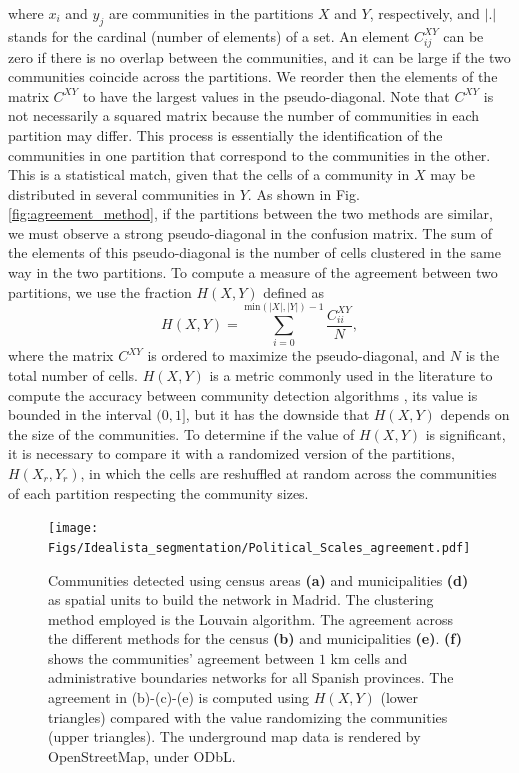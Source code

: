 where $x_i$ and $y_j$ are communities in the partitions $X$ and $Y$, respectively, and $| . |$ stands for the cardinal (number of elements) of a set. An element $C^{XY}_{ij}$ can be zero if there is no overlap between the communities, and it can be large if the two communities coincide across the partitions. We reorder then the elements of the matrix  $C^{XY}$ to have the largest values in the pseudo-diagonal. Note that $C^{XY}$ is not necessarily a squared matrix because the number of communities in each partition may differ. This process is essentially the identification of the communities in one partition that correspond to the communities in the other. This is a statistical match, given that the cells of a community in $X$ may be distributed in several communities in $Y$. As shown in Fig. \ref{fig:agreement_method}, if the partitions between the two methods are similar, we must observe a strong pseudo-diagonal in the confusion matrix. The sum of the elements of this pseudo-diagonal is the number of cells clustered in the same way in the two partitions. To compute a measure of the agreement between two partitions, we use the fraction $H(X,Y)$ \cite{girvan2002community,hric2014community} defined as 
\begin{equation}
H(X,Y) = \sum_{i = 0}^{\textrm{min}(|X|,|Y|)-1} \frac{C^{XY}_{ii}}{N} , 
\end{equation}
where the matrix $C^{XY}$ is ordered to maximize the pseudo-diagonal, and $N$ is the total number of cells. $H(X,Y)$ is a metric commonly used in the literature to compute the accuracy between community detection algorithms \cite{danon2005comparing,duch2005community,li2008quantitative,darst2014improving,chen2015deep,saoud2016community,wang2017mitigation,fortunato2016community}, its value is bounded in the interval $(0,1]$, but it has the downside that $H(X,Y)$ depends on the size of the communities. To determine if the value of $H(X,Y)$ is significant, it is necessary to compare it with a randomized version of the partitions, $H(X_r,Y_r)$, in which the cells are reshuffled at random across the communities of each partition respecting the community sizes.

\begin{figure}
    \centering
    \texttt{[image: Figs/Idealista\_segmentation/Political\_Scales\_agreement.pdf]}
	\caption[Community detection from networks using administrative spatial units.]{ Communities detected using census areas \textbf{(a)} and municipalities \textbf{(d)} as spatial units to build the network in Madrid. The clustering method employed is the Louvain algorithm. The agreement across the different methods for the census \textbf{(b)} and municipalities \textbf{(e)}. \textbf{(f)} shows the communities' agreement between $1$ km cells and administrative boundaries networks for all Spanish provinces. The agreement in (b)-(c)-(e) is computed using $H(X,Y)$ (lower triangles) compared with the value randomizing the communities (upper triangles).  The underground map data is rendered by OpenStreetMap, under ODbL. \label{fig:political_scales}}
\end{figure}

